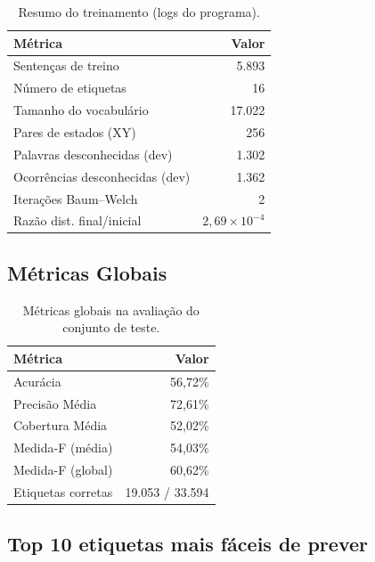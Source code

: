 \documentclass[12pt,a4paper]{article}
\begin{document}
\begin{table}[H]
\centering
\begin{tabular}{lr}
\toprule
\textbf{Métrica} & \textbf{Valor} \\
\midrule
Sentenças de treino & 5.893 \\
Número de etiquetas & 16 \\
Tamanho do vocabulário & 17.022 \\
Pares de estados (XY) & 256 \\
Palavras desconhecidas (dev) & 1.302 \\
Ocorrências desconhecidas (dev) & 1.362 \\
Iterações Baum--Welch & 2 \\
Razão dist. final/inicial & $2{,}69\times10^{-4}$ \\
\bottomrule
\end{tabular}
\caption{Resumo do treinamento (logs do programa).}
\end{table}

\subsection{Métricas Globais}

\begin{table}[H]
\centering
\begin{tabular}{lr}
\toprule
\textbf{Métrica} & \textbf{Valor} \\
\midrule
Acurácia & 56,72\% \\
Precisão Média & 72,61\% \\
Cobertura Média & 52,02\% \\
Medida-F (média) & 54,03\% \\
Medida-F (global) & 60,62\% \\
Etiquetas corretas & 19.053 / 33.594 \\
\bottomrule
\end{tabular}
\caption{Métricas globais na avaliação do conjunto de teste.}
\end{table}

\subsection{Top 10 etiquetas mais fáceis de prever}
\end{document}
